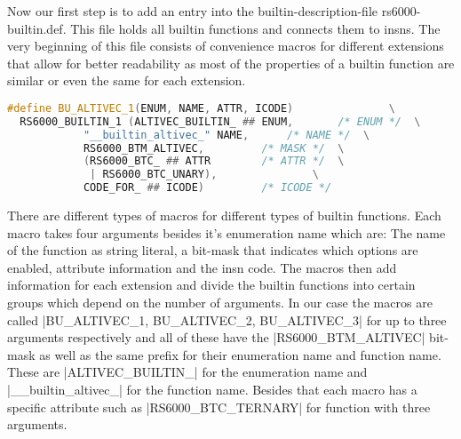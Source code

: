 Now our first step is to add an entry into the builtin-description-file rs6000-builtin.def. This file holds all builtin functions and connects them to insns. The very beginning of this file consists of convenience macros for different extensions that allow for better readability as most of the properties of a builtin function are similar or even the same for each extension.
\begin{lstlisting}[language=C++,basicstyle=\ttfamily\scriptsize,keywordstyle=\color{red}]
#define BU_ALTIVEC_1(ENUM, NAME, ATTR, ICODE)				\
  RS6000_BUILTIN_1 (ALTIVEC_BUILTIN_ ## ENUM,		/* ENUM */	\
  		    "__builtin_altivec_" NAME,		/* NAME */	\
  		    RS6000_BTM_ALTIVEC,			/* MASK */	\
  		    (RS6000_BTC_ ## ATTR		/* ATTR */	\
   		     | RS6000_BTC_UNARY),				\
  		    CODE_FOR_ ## ICODE)			/* ICODE */
\end{lstlisting}
There are different types of macros for different types of builtin functions. Each macro takes four arguments besides it's enumeration name which are: The name of the function as string literal, a bit-mask that indicates which options are enabled, attribute information and the insn code. 
The macros then add information for each extension and divide the builtin functions into certain groups which depend on the number of arguments. In our case the macros are called |BU_ALTIVEC_1, BU_ALTIVEC_2, BU_ALTIVEC_3| for up to three arguments respectively and all of these have the |RS6000_BTM_ALTIVEC| bit-mask as well as the same prefix for their enumeration name and function name. These are |ALTIVEC_BUILTIN_| for the enumeration name and |__builtin_altivec_| for the function name. Besides that each macro has a specific attribute such as |RS6000_BTC_TERNARY| for function with three arguments.

